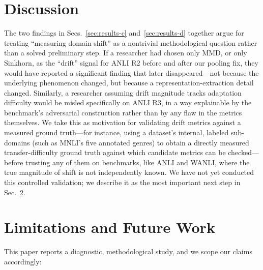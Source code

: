\documentclass[conference]{IEEEtran}
\begin{document}
\section{Discussion}

The two findings in Secs.~\ref{sec:results-c} and~\ref{sec:results-d} together argue for treating ``measuring domain shift'' as a nontrivial methodological question rather than a solved preliminary step. If a researcher had chosen only MMD, or only Sinkhorn, as the ``drift'' signal for ANLI R2 before and after our pooling fix, they would have reported a significant finding that later disappeared---not because the underlying phenomenon changed, but because a representation-extraction detail changed. Similarly, a researcher assuming drift magnitude tracks adaptation difficulty would be misled specifically on ANLI R3, in a way explainable by the benchmark's adversarial construction rather than by any flaw in the metrics themselves. We take this as motivation for validating drift metrics against a measured ground truth---for instance, using a dataset's internal, labeled sub-domains (such as MNLI's five annotated genres) to obtain a directly measured transfer-difficulty ground truth against which candidate metrics can be checked---before trusting any of them on benchmarks, like ANLI and WANLI, where the true magnitude of shift is not independently known. We have not yet conducted this controlled validation; we describe it as the most important next step in Sec.~\ref{sec:limitations}.

\section{Limitations and Future Work}
\label{sec:limitations}

This paper reports a diagnostic, methodological study, and we scope our claims accordingly:
\end{document}
